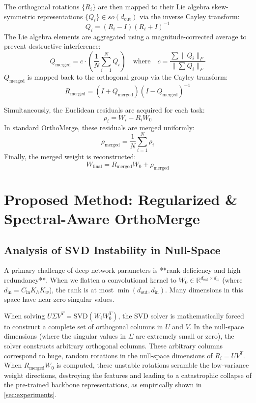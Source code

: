 \documentclass{article}
\theoremstyle{plain}
\theoremstyle{definition}
\theoremstyle{remark}
\begin{document}
The orthogonal rotations $\{R_i\}$ are then mapped to their Lie algebra skew-symmetric representations $\{Q_i\} \in so(d_{\text{out}})$ via the inverse Cayley transform:
\begin{equation}
  Q_i = (R_i - I)(R_i + I)^{-1}
\end{equation}
The Lie algebra elements are aggregated using a magnitude-corrected average to prevent destructive interference:
\begin{equation}
  Q_{\text{merged}} = c \cdot \left( \frac{1}{N} \sum_{i=1}^N Q_i \right) \quad \text{where} \quad c = \frac{\sum \|Q_i\|_F}{\|\sum Q_i\|_F}
\end{equation}
$Q_{\text{merged}}$ is mapped back to the orthogonal group via the Cayley transform:
\begin{equation}
  R_{\text{merged}} = (I + Q_{\text{merged}})(I - Q_{\text{merged}})^{-1}
\end{equation}

Simultaneously, the Euclidean residuals are acquired for each task:
\begin{equation}
  \rho_i = W_i - R_i W_0
\end{equation}
In standard OrthoMerge, these residuals are merged uniformly:
\begin{equation}
  \rho_{\text{merged}} = \frac{1}{N} \sum_{i=1}^N \rho_i
\end{equation}
Finally, the merged weight is reconstructed:
\begin{equation}
  W_{\text{final}} = R_{\text{merged}} W_0 + \rho_{\text{merged}}
\end{equation}

\section{Proposed Method: Regularized \& Spectral-Aware OrthoMerge}
\label{sec:method}

\subsection{Analysis of SVD Instability in Null-Space}
A primary challenge of deep network parameters is **rank-deficiency and high redundancy**. When we flatten a convolutional kernel to $W_0 \in \mathbb{R}^{d_{\text{out}} \times d_{\text{in}}}$ (where $d_{\text{in}} = C_{\text{in}} K_h K_w$), the rank is at most $\min(d_{\text{out}}, d_{\text{in}})$. Many dimensions in this space have near-zero singular values.

When solving $U \Sigma V^T = \text{SVD}(W_i W_0^T)$, the SVD solver is mathematically forced to construct a complete set of orthogonal columns in $U$ and $V$. In the null-space dimensions (where the singular values in $\Sigma$ are extremely small or zero), the solver constructs arbitrary orthogonal columns. These arbitrary columns correspond to huge, random rotations in the null-space dimensions of $R_i = U V^T$. When $R_{\text{merged}} W_0$ is computed, these unstable rotations scramble the low-variance weight directions, destroying the features and leading to a catastrophic collapse of the pre-trained backbone representations, as empirically shown in \cref{sec:experiments}.
\end{document}
